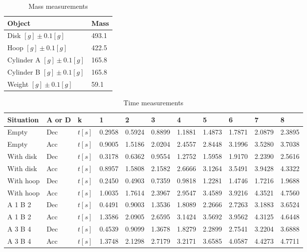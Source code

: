 \begin{table}[H]
  \centering
  \begin{tabularx}{\textwidth}{|X|X|}
    \hline
    Object & Mass\\
	\hline
    Disk $[g] \pm 0.1 [g] $ & 493.1\\
    Hoop $[g] \pm 0.1 [g] $ & 422.5\\
    Cylinder A $[g] \pm 0.1 [g] $ & 165.8\\
    Cylinder B $[g] \pm 0.1 [g] $ & 165.8\\
    Weight $[g] \pm 0.1 [g] $ & 59.1 \\
    \hline
  \end{tabularx}
  \caption{Mass measurements}
  \end{table}
\begin{table}[H]
  \centering
\begin{tabular}{|p{2cm}|p{1.5cm}|l|l|l|l|l|l|l|l|l|}
\hline
Situation & A or D & k & 1 & 2 & 3 & 4 & 5 & 6 & 7 & 8 \\
\hline
Empty & Dec & $t[s]$ & 0.2958 & 0.5924 & 0.8899 & 1.1881 & 1.4873 & 1.7871 & 2.0879 & 2.3895 \\
Empty & Acc & $t[s]$ & 0.9005 & 1.5186 & 2.0204 & 2.4557 & 2.8448 & 3.1996 & 3.5280 & 3.7038 \\
With disk & Dec &  $t[s]$ & 0.3178 & 0.6362 & 0.9554 & 1.2752 & 1.5958 & 1.9170 & 2.2390 & 2.5616 \\
With disk & Acc &  $t[s]$ & 0.8957 & 1.5808 & 2.1582 & 2.6666 & 3.1264 & 3.5491 & 3.9428 & 4.3322 \\
With hoop & Dec &  $t[s]$ & 0.2450 & 0.4903 & 0.7359 & 0.9818 & 1.2281 & 1.4746 & 1.7216 & 1.9688 \\
With hoop & Acc &  $t[s]$ & 1.0035 & 1.7614 & 2.3967 & 2.9547 & 3.4589 & 3.9216 & 4.3521 & 4.7560 \\
A 1 B 2 & Dec &  $t[s]$ & 0.4491 & 0.9003 & 1.3536 & 1.8089 & 2.2666 & 2.7263 & 3.1883 & 3.6524 \\
A 1 B 2 & Acc &  $t[s]$ & 1.3586 & 2.0905 & 2.6595 & 3.1424 & 3.5692 & 3.9562 & 4.3125 & 4.6448 \\
A 3 B 4 & Dec &  $t[s]$ & 0.4539 & 0.9099 & 1.3678 & 1.8279 & 2.2899 & 2.7541 & 3.2204 & 3.6888 \\
A 3 B 4 & Acc &  $t[s]$ & 1.3748 & 2.1298 & 2.7179 & 3.2171 & 3.6585 & 4.0587 & 4.4273 & 4.7711 \\
\hline
\end{tabular}
\caption{ Time measurements}
\end{table}

